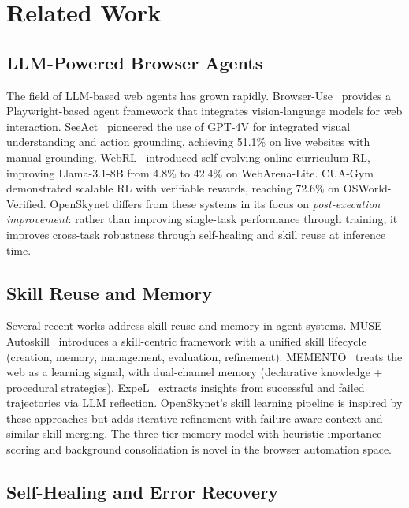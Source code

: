 \section{Related Work}
\label{sec:related}

\subsection{LLM-Powered Browser Agents}

The field of LLM-based web agents has grown rapidly. Browser-Use~\cite{browseruse} provides a Playwright-based agent framework that integrates vision-language models for web interaction. SeeAct~\cite{seeact} pioneered the use of GPT-4V for integrated visual understanding and action grounding, achieving 51.1\% on live websites with manual grounding. WebRL~\cite{webrl} introduced self-evolving online curriculum RL, improving Llama-3.1-8B from 4.8\% to 42.4\% on WebArena-Lite. CUA-Gym~\cite{cuagym} demonstrated scalable RL with verifiable rewards, reaching 72.6\% on OSWorld-Verified. OpenSkynet differs from these systems in its focus on \emph{post-execution improvement}: rather than improving single-task performance through training, it improves cross-task robustness through self-healing and skill reuse at inference time.

\subsection{Skill Reuse and Memory}

Several recent works address skill reuse and memory in agent systems. MUSE-Autoskill~\cite{museautoskill} introduces a skill-centric framework with a unified skill lifecycle (creation, memory, management, evaluation, refinement). MEMENTO~\cite{memento} treats the web as a learning signal, with dual-channel memory (declarative knowledge + procedural strategies). ExpeL~\cite{expel} extracts insights from successful and failed trajectories via LLM reflection. OpenSkynet's skill learning pipeline is inspired by these approaches but adds iterative refinement with failure-aware context and similar-skill merging. The three-tier memory model with heuristic importance scoring and background consolidation is novel in the browser automation space.

\subsection{Self-Healing and Error Recovery}

